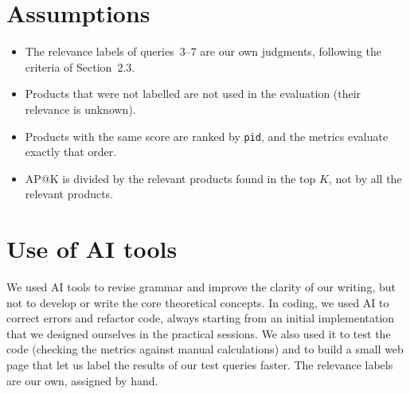 \documentclass[11pt,a4paper]{article}
\begin{document}
\section{Assumptions}
\begin{itemize}
  \item The relevance labels of queries~3--7 are our own judgments, following the criteria of Section~2.3.
  \item Products that were not labelled are not used in the evaluation (their relevance is unknown).
  \item Products with the same score are ranked by \texttt{pid}, and the metrics evaluate exactly that order.
  \item AP@K is divided by the relevant products found in the top $K$, not by all the relevant products.
\end{itemize}

\section*{Use of AI tools}
We used AI tools to revise grammar and improve the clarity of our writing, but not to develop or write the core theoretical 
concepts. In coding, we used AI to correct errors and refactor code, always starting from an initial implementation that we 
designed ourselves in the practical sessions. We also used it to test the code (checking the metrics against manual calculations) and to build a small 
web page that let us label the results of our test queries faster. The relevance labels are our own, assigned by hand.
\end{document}
